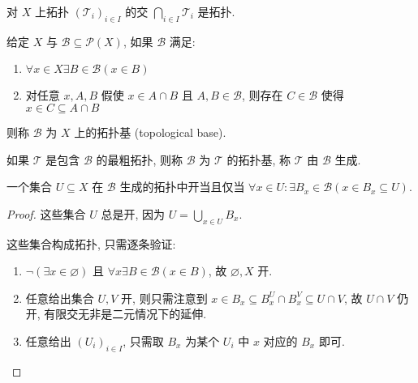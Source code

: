 \begin{lemma}
    对 \(X\) 上拓扑 \({(\mathcal{T}_i)}_{i \in I}\) 的交 \(\bigcap_{i \in I} \mathcal{T}_i\) 是拓扑.
\end{lemma}

\begin{definition}[拓扑基]
    给定 \(X\) 与 \(\mathcal{B} \subseteq \mathcal{P}(X)\), 如果 \(\mathcal{B}\) 满足:
    \begin{enumerate}
        \item \(\forall x \in X \exists B \in \mathcal{B} (x \in B)\)
        \item 对任意 \(x,A,B\) 假使 \(x \in A \cap B\) 且 \(A,B \in \mathcal{B}\), 则存在 \(C \in \mathcal{B}\) 使得 \(x \in C \subseteq A \cap B\)
    \end{enumerate}
    则称 \(\mathcal{B}\) 为 \(X\) 上的拓扑基 (topological base).
\end{definition}

\begin{definition}
    如果 \(\mathcal{T}\) 是包含 \(\mathcal{B}\) 的最粗拓扑, 则称 \(\mathcal{B}\) 为 \(\mathcal{T}\) 的拓扑基, 称 \(\mathcal{T}\) 由 \(\mathcal{B}\) 生成.
\end{definition}

\begin{lemma}
    \label {lemma:topology generated by base}
    一个集合 \(U \subseteq X\) 在 \(\mathcal{B}\) 生成的拓扑中开当且仅当 \(\forall x \in U : \exists B_x \in \mathcal{B} (x \in B_x \subseteq U)\).

    \begin{proof}
        这些集合 \(U\) 总是开, 因为 \(U = \bigcup_{x \in U} B_x\).

        这些集合构成拓扑, 只需逐条验证:
        \begin{enumerate}
            \item \(\neg (\exists x \in \varnothing)\) 且 \(\forall x \exists B \in \mathcal{B} (x \in B)\), 故 \(\varnothing, X\) 开.
            \item 任意给出集合 \(U,V\) 开, 则只需注意到 \(x \in B_x \subseteq B_x^U \cap B_x^V \subseteq U \cap V\), 故 \(U \cap V\) 仍开, 有限交无非是二元情况下的延伸.
            \item 任意给出 \({(U_i)}_{i \in I}\), 只需取 \(B_x\) 为某个 \(U_i\) 中 \(x\) 对应的 \(B_x\) 即可.
        \end{enumerate}
    \end{proof}
\end{lemma}

